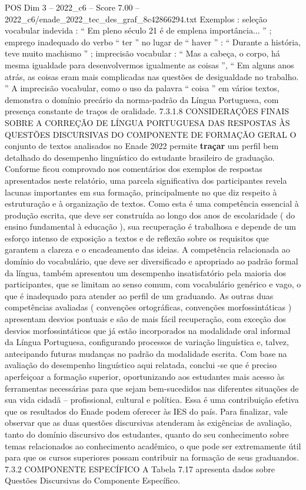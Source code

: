 \begin{textsample}{POS Dim 3 – 2022\_c6 – Score 7.00 – 2022\_c6/enade\_2022\_tec\_des\_graf\_8c42866294.txt}
Exemplos : seleção vocabular indevida : “ Em pleno século 21 é de emplena importância... ” ; emprego inadequado do verbo “ ter ” no lugar de “ haver ” : “ Durante a história, teve muito machismo ” ; imprecisão vocabular : “ Mas a cabeça, o corpo, há mesma igualdade para desenvolvermos igualmente as coisas ”, “ Em alguns anos atrás, as coisas eram mais complicadas nas questões de desigualdade no trabalho. ” A imprecisão vocabular, como o uso da palavra “ coisa ” em vários textos, demonstra o domínio precário da norma-padrão da Língua Portuguesa, com presença constante de traços de oralidade. 7.3.1.8 CONSIDERAÇÕES FINAIS SOBRE A CORREÇÃO DE LÍNGUA PORTUGUESA DAS RESPOSTAS ÀS QUESTÕES DISCURSIVAS DO COMPONENTE DE FORMAÇÃO GERAL O conjunto de textos analisados no Enade 2022 permite \textbf{traçar} um perfil bem detalhado do desempenho linguístico do estudante brasileiro de graduação.
Conforme ficou comprovado nos comentários dos exemplos de respostas apresentados neste relatório, uma parcela significativa dos participantes revela lacunas importantes em sua formação, principalmente no que diz respeito à estruturação e à organização de textos.
Como esta é uma competência essencial à produção escrita, que deve ser construída ao longo dos anos de escolaridade ( do ensino fundamental à educação ), sua recuperação é trabalhosa e depende de um esforço intenso de exposição a textos e de reflexão sobre os requisitos que garantem a clareza e o encadeamento das ideias.
A competência relacionada ao domínio do vocabulário, que deve ser diversificado e apropriado ao padrão formal da língua, também apresentou um desempenho insatisfatório pela maioria dos participantes, que se limitam ao senso comum, com vocabulário genérico e vago, o que é inadequado para atender ao perfil de um graduando.
As outras duas competências avaliadas ( convenções ortográficas, convenções morfossintáticas ) apresentam desvios pontuais e são de mais fácil recuperação, com exceção dos desvios morfossintáticos que já estão incorporados na modalidade oral informal da Língua Portuguesa, configurando processos de variação linguística e, talvez, antecipando futuras mudanças no padrão da modalidade escrita.
Com base na avaliação do desempenho linguístico aqui relatada, conclui -se que é preciso aperfeiçoar a formação superior, oportunizando aos estudantes mais acesso às ferramentas necessárias para que sejam bem-sucedidos nas diferentes situações de sua vida cidadã – profissional, cultural e política.
Essa é uma contribuição efetiva que os resultados do Enade podem oferecer às IES do país.
Para finalizar, vale observar que as duas questões discursivas atenderam às exigências de avaliação, tanto do domínio discursivo dos estudantes, quanto do seu conhecimento sobre temas relacionados ao conhecimento acadêmico, o que pode ser extremamente útil para que os cursos superiores possam contribuir na formação de seus graduandos. 7.3.2 COMPONENTE ESPECÍFICO A Tabela 7.17 apresenta dados sobre Questões Discursivas do Componente Específico.

\end{textsample}
